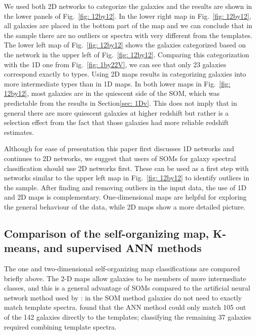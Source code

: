         We used both 2D networks to categorize the  galaxies and the results are shown in the lower panels of Fig.~\ref{fig: 12by12}.
        In the lower right map in Fig.~\ref{fig: 12by12}, all galaxies are placed in the bottom part of the map and we can conclude that in the  sample there are no outliers or spectra with very different from the  templates.
        The lower left map of Fig.~\ref{fig: 12by12} shows the  galaxies categorized based on the network in the upper left of Fig.~\ref{fig: 12by12}. 
        Comparing this categorization with the 1D one from Fig.~\ref{fig: 1by22V}, we can see that only 23 galaxies correspond exactly to  types.
        Using 2D maps results in categorizing galaxies into more intermediate types than in 1D maps.
        In both lower maps in Fig.~\ref{fig: 12by12}, most galaxies are in the quiescent side of the SOM, which was predictable from the results in Section\ref{sec: 1Dv}. 
        This does not imply that in general there are more quiescent galaxies at higher redshift but rather is a selection effect from the fact that those galaxies had more reliable redshift estimates.
        
    Although for ease of presentation this paper first discusses 1D networks and continues to 2D networks, we suggest that users of SOMs for galaxy spectral classification should use 2D networks first.
         These can be used as a first step with networks similar to the upper left map in Fig.~\ref{fig: 12by12} to identify outliers in the sample.
        After finding and removing outliers in the input data, the use of 1D and 2D maps is complementary.
        One-dimensional maps are helpful for exploring the general behaviour of the data, while 2D maps show a more detailed picture.
   
\subsection{Comparison of the self-organizing map, K-means, and supervised ANN methods}
    \label{sec: Kmeansvssom}
    The one and two-dimensional self-organizing map classifications are compared briefly above. 
    The 2-D maps allow galaxies to be members of more intermediate classes, and this is a general advantage of SOMs compared to the artificial neural network method used by : in the SOM method galaxies do not need to exactly match template spectra. 
     found that the ANN method could only match 105 out of the 142 galaxies directly to the  templates; classifying the remaining 37 galaxies required combining template spectra.
     
